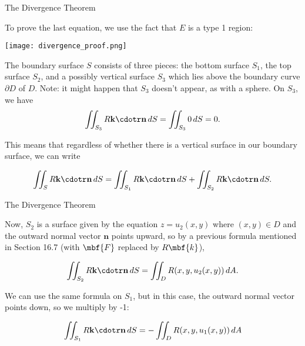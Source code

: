 \documentclass[11pt,english,
handout
]{beamer}
\begin{document}
\begin{frame}[t]{The Divergence Theorem}
\small
\begin{proofs}

To prove the last equation, we use the fact that $E$ is a type 1 region:

\lspace
\begin{minipage}{0.4\textwidth}
\centering
\texttt{[image: divergence\_proof.png]}
\end{minipage}%
\begin{minipage}{0.55\textwidth}

The boundary surface $S$ consists of three pieces: the bottom surface $S_1$, the top surface $S_2$, and a possibly vertical surface $S_3$ which lies above the boundary curve $\partial D$ of $D$. \pause Note: it might happen that $S_3$ doesn't appear, as with a sphere. \pause On $S_3$, we have
\[
\iint_{S_3}R\mathbf{k}\cdotr\mathbf{n}\,dS=\iint_{S_3}0\,dS=0.
\]
\end{minipage}\pause

\lspace
This means that regardless of whether there is a vertical surface in our boundary surface, we can write

\[
\iint_SR\mathbf{k}\cdotr\mathbf{n}\,dS=\iint_{S_1}R\mathbf{k}\cdotr\mathbf{n}\,dS+\iint_{S_2}R\mathbf{k}\cdotr\mathbf{n}\,dS.
\]

\end{proofs}
\end{frame}












\begin{frame}[t]{The Divergence Theorem}
\small
\begin{proofs}
Now, $S_2$ is a surface given by the equation $z=u_2(x,y)$ where $(x,y)\in D$ and the outward normal vector $\mathbf{n}$ points upward, so by a previous formula mentioned in Section 16.7 (with $\mbf{F}$ replaced by $R\mbf{k}$),

\[
\iint_{S_2}R\mathbf{k}\cdotr\mathbf{n}\,dS=\iint_DR(x,y,u_2(x,y))\,dA.
\]\pause 

We can use the same formula on $S_1$, but in this case, the outward normal vector points down, so we multiply by -1:

\[
\iint_{S_1}R\mathbf{k}\cdotr\mathbf{n}\,dS=-\iint_DR(x,y,u_1(x,y))\,dA
\]
\end{proofs}
\end{frame}
\end{document}
